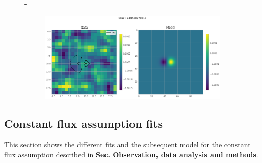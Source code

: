 \documentclass[
	a4paper, %
	10pt, %
	unnumberedsections, %
	twoside, %
]{LTJournalArticle}
\begin{document}
\begin{figure}[H]
\begin{subfigure}{.47\textwidth}
    \end{subfigure}
    \hspace{1em}-
    \begin{subfigure}{.47\textwidth}
        \includegraphics[width=\textwidth]{report/Figures/models/2404/27_psf_notconst.png}
    \end{subfigure}%
    \caption{}
    \label{model_const_24}
    \end{figure}

\subsection{Constant flux assumption fits}

This section shows the different fits and the subsequent model for the constant flux assumption described in \textbf{Sec. Observation, data analysis and methods}.
\end{document}
